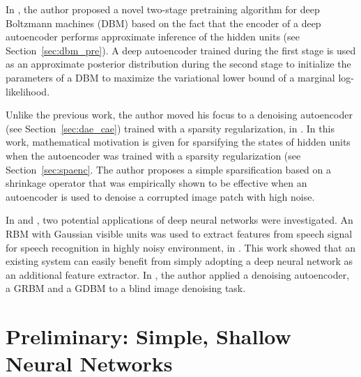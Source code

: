 \documentclass[dissertation,nocontribution]{aaltoseries}
\begin{document}
In \textbf{}, the author proposed a
novel two-stage pretraining algorithm for deep Boltzmann
machines (DBM) based on the fact that the encoder of a deep
autoencoder performs approximate inference of the hidden
units (see Section~\ref{sec:dbm_pre}).  A deep autoencoder
trained during the first stage is used as an approximate
posterior distribution during the second stage to initialize
the parameters of a DBM to maximize the variational lower
bound of a marginal log-likelihood. 

Unlike the previous work, the author moved his focus to a
denoising autoencoder (see Section~\ref{sec:dae_cae})
trained with a sparsity regularization, in
\textbf{}. In this work, mathematical motivation
is given for sparsifying the states of hidden units when the
autoencoder was trained with a sparsity regularization (see
Section~\ref{sec:spaenc}. The
author proposes a simple sparsification based on a shrinkage
operator that was empirically shown to be effective when an
autoencoder is used to denoise a corrupted image patch with
high noise.


In \textbf{} and
\textbf{}, two potential applications
of deep neural networks were investigated. An RBM with
Gaussian visible units was used to extract features from
speech signal for speech recognition in highly noisy
environment, in . This work showed
that an existing system can easily benefit from simply
adopting a deep neural network as an additional feature
extractor. In , the author applied a
denoising autoencoder, a GRBM and a GDBM to a blind image
denoising task.












\chapter{Preliminary: Simple, Shallow Neural Networks}
\label{chapter:simple_neural_networks}
\end{document}
